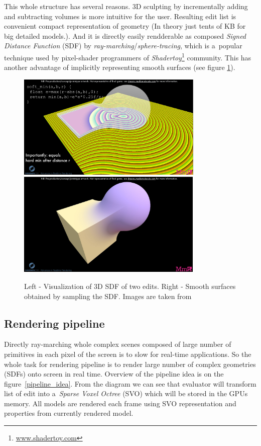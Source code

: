 \documentclass[11pt, a4paper]{article}
\begin{document}
This whole structure has several reasons.
3D sculpting by incrementally adding and subtracting volumes is more intuitive for the user.
Resulting edit list is convenient compact representation of geometry (In theory just tents of KB for big detailed models.).
And it is directly easily rendderable as composed \emph{Signed Distance Function} (SDF) by \emph{ray-marching}/\emph{sphere-tracing}, which is a~popular technique used by pixel-shader programmers of \emph{Shadertoy}\footnote{\href{www.shadertoy.com}{www.shadertoy.com}} community.
This has another advantage of implicitly representing smooth surfaces (see figure \ref{ray_marching_fig}).
\begin{figure}
    \centering
    \includegraphics[height=5cm,keepaspectratio]{SDF.png}
    \includegraphics[height=5cm,keepaspectratio]{SDF_RES.png}
    \caption{Left - Visualization of 3D SDF of two edits. Right - Smooth surfaces obtained by sampling the SDF. Images are taken from \cite{evans2015}}
    \label{ray_marching_fig}
\end{figure}

\subsection{Rendering pipeline}

Directly ray-marching whole complex scenes composed of large number of primitives in each pixel of the screen is to slow for real-time applications.
So the whole task for rendering pipeline is to render large number of complex geometries (SDFs) onto screen in real time.
Overview of the pipeline idea is on the figure~\ref{pipeline_idea}.
From the diagram we can see that evaluator will transform list of edit into a~\emph{Sparse Voxel Octree} (SVO) which will be stored in the GPUs memory.
All models are rendered each frame using SVO representation and properties from currently rendered model.
\end{document}
